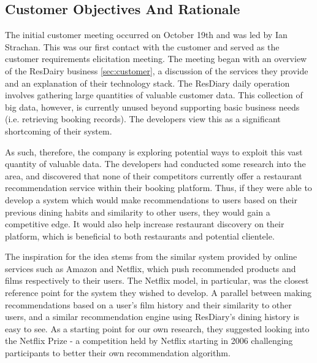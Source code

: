 \documentclass{l3proj}
\begin{document}

\subsection{Customer Objectives And Rationale}
\label{sec:custobjectives}


The initial customer meeting occurred on October 19th and was led by Ian Strachan. This was our first contact with the customer and served as the customer requirements elicitation meeting. The meeting began with an overview of the ResDairy business \ref{sec:customer}, a discussion of the services they provide and an explanation of their technology stack. The ResDiary daily operation involves gathering large quantities of valuable customer data. This collection of big data, however, is currently unused beyond supporting basic business needs (i.e. retrieving booking records). The developers view this as a significant shortcoming of their system.

As such, therefore, the company is exploring potential ways to exploit this vast quantity of valuable data. The developers had conducted some research into the area, and discovered that none of their competitors currently offer a restaurant recommendation service within their booking platform. Thus, if they were able to develop a system which would make recommendations to users based on their previous dining habits and similarity to other users, they would gain a competitive edge. It would also help increase restaurant discovery on their platform, which is beneficial to both restaurants and potential clientele. 

The inspiration for the idea stems from the similar system provided by online services such as Amazon and Netflix, which push recommended products and films respectively to their users. The Netflix model, in particular, was the closest reference point for the system they wished to develop. A parallel between making recommendations based on a user's film history and their similarity to other users, and a similar recommendation engine using ResDiary's dining history is easy to see. As a starting point for our own research, they suggested looking into the Netflix Prize - a competition held by Netflix starting in 2006 challenging participants to better their own recommendation algorithm. 
\end{document}
